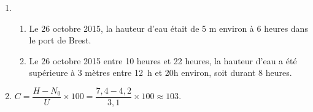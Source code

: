
\medskip

\begin{enumerate}
\item 
	\begin{enumerate}
		\item Le 26 octobre 2015, la hauteur d'eau était de 5 m environ à 6 heures dans le port de Brest.
		\item Le 26 octobre 2015 entre 10 heures et 22 heures, la hauteur d'eau a été supérieure à 3 mètres entre 12~h et 20h environ, soit durant 8 heures.
	\end{enumerate}
\item $C = \dfrac{H - N_0}{U} \times 100 = \dfrac{7,4 - 4,2}{3,1} \times 100 \approx 103$.
\end{enumerate}

\vspace{0,5cm}

